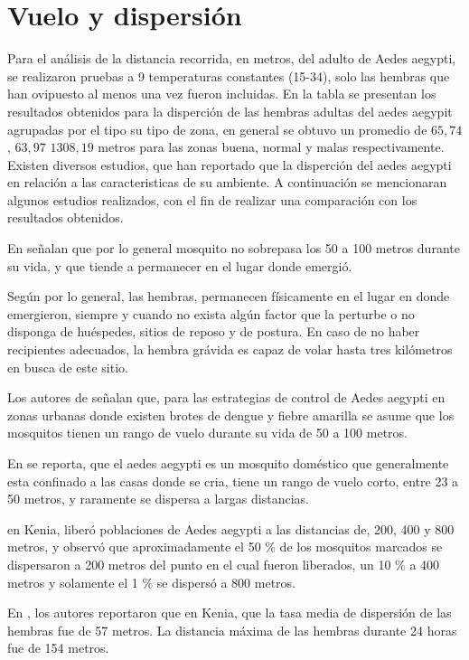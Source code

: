 \section{Vuelo y dispersión}
Para el análisis de la distancia recorrida, en metros, del adulto de Aedes aegypti, se realizaron
pruebas a 9 temperaturas constantes (15-34\textcelsius), solo las hembras que han ovipuesto al
menos una vez fueron incluidas. En la tabla  se presentan los
resultados obtenidos para la disperción de las hembras adultas del aedes aegypit agrupadas por el
tipo su tipo de zona, en general se obtuvo un promedio de $65,74$, $63,97$ $1308,19$ metros para las zonas buena, normal y malas respectivamente. Existen diversos estudios, que han reportado que
la disperción del aedes aegypti en relación a las caracteristicas de su ambiente. A continuación
se mencionaran algunos estudios realizados, con el fin de realizar una comparación con los resultados obtenidos.

En \citet{cabezas2005dengue} señalan que por lo general mosquito no sobrepasa los 50 a 100 metros
durante su vida, y que tiende a permanecer en el lugar donde emergió.

Según \citet{ThironIzcazaJ2003} por lo general, las hembras, permanecen físicamente en el lugar en
donde emergieron, siempre y cuando no exista algún factor que la perturbe o no disponga de
huéspedes, sitios de reposo y de postura. En caso de no haber recipientes adecuados, la hembra
grávida es capaz de volar hasta tres kilómetros en busca de este sitio.

Los autores de \citet{dengueUruguayCap8} señalan que, para las estrategias de control de Aedes
aegypti en zonas urbanas donde existen brotes de dengue y fiebre amarilla se asume que los
mosquitos tienen un rango de vuelo durante su vida de 50 a 100 metros.

En \citet{luevano1993ciclo} se reporta, que el aedes aegypti es un mosquito doméstico que
generalmente esta confinado a las casas donde se cria, tiene un rango de vuelo corto, entre 23 a
50 metros, y raramente se dispersa a largas distancias.

\citet{mcdonald1977population} en Kenia, liberó poblaciones de Aedes aegypti a las distancias de,
200, 400 y 800 metros, y observó que aproximadamente el 50 \% de los mosquitos marcados se
dispersaron a 200 metros del punto en el cual fueron liberados, un 10 \% a 400 metros y solamente
el 1 \% se dispersó a 800 metros.

En \citet{trpis1986dispersal}, los autores reportaron que en Kenia, que la tasa media de dispersión
de las hembras fue de 57 metros. La distancia máxima de las hembras durante 24 horas fue de 154
metros.

